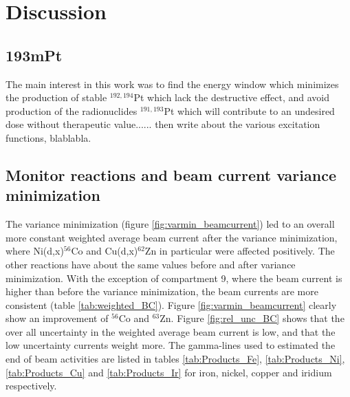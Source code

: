 \chapter{Discussion}

\section{193mPt}
The main interest in this work was to find the energy window which minimizes the production of stable $^{192,194}$Pt which lack the destructive effect, and avoid production of the radionuclides $^{191,193}$Pt which will contribute to an undesired dose without therapeutic value...... then write about the various excitation functions, blablabla. 





\section{Monitor reactions and beam current variance minimization}

The variance minimization (figure \ref{fig:varmin_beamcurrent}) led to an overall more constant weighted average beam current after the variance minimization, where Ni(d,x)$^{56}$Co and Cu(d,x)$^{62}$Zn in particular were affected positively. The other reactions have about the same values before and after variance minimization. With the exception of compartment 9, where the beam current is higher than before the variance minimization, the beam currents are more consistent (table \ref{tab:weighted_BC}). Figure \ref{fig:varmin_beamcurrent} clearly show an improvement of $^{56}$Co and $^{63}$Zn. Figure \ref{fig:rel_unc_BC} shows that the over all uncertainty in the weighted average beam current is low, and that the low uncertainty currents weight more. The gamma-lines used to estimated the end of beam activities are listed in tables \ref{tab:Products_Fe}, \ref{tab:Products_Ni}, \ref{tab:Products_Cu} and \ref{tab:Products_Ir} for iron, nickel, copper and iridium respectively. \\ 

